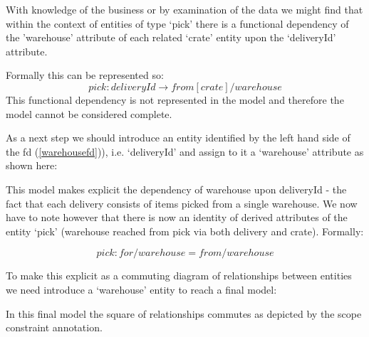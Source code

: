 \documentclass[10pt,a4paper]{scrartcl}
\renewcommand{\erpictureFolder}[0]{../SharedPictures}
\begin{document}
With knowledge of the business or by examination of the data we might find that  within the context 
of entities of type `pick' there is a functional dependency of the 'warehouse' attribute of each  related `crate' entity upon the `deliveryId' attribute.

Formally this can be represented so:
\begin{equation}
\label{warehousefd}
pick: deliveryId \longrightarrow  from[crate]/warehouse
\end{equation}
This functional dependency is not represented in the model and therefore the model cannot be 
considered complete.

As a next step we should introduce an entity identified by the left hand side 
of the fd (\ref{warehousefd})), i.e.
 `deliveryId' and assign to it a `warehouse' attribute as shown here:
\begin{center}

\end{center}
This model makes explicit the dependency of warehouse upon deliveryId - the fact that each delivery consists of items picked from a single warehouse. We now have to note however that there is now
an identity of derived attributes of the entity `pick' (warehouse reached from pick via both delivery and crate). Formally:

\begin{equation}
pick:for/warehouse=from/warehouse
\end{equation}

To make this explicit as a commuting diagram of relationships between entities
we need introduce a `warehouse' entity  to reach a final model:

\begin{center}

\end{center}
In this final model the square of relationships commutes as depicted by the scope constraint annotation.

 

\end{document}
